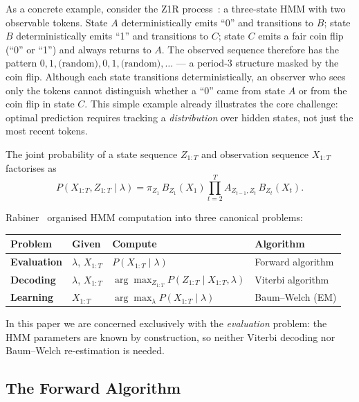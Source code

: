 \documentclass[11pt]{article}
\begin{document}
As a concrete example, consider the Z1R process~\cite{rabiner1989}: a three-state HMM with two observable tokens.  State $A$ deterministically emits ``0'' and transitions to $B$; state $B$ deterministically emits ``1'' and transitions to $C$; state $C$ emits a fair coin flip (``0'' or ``1'') and always returns to $A$.  The observed sequence therefore has the pattern $0, 1, \text{(random)}, 0, 1, \text{(random)}, \ldots$ --- a period-3 structure masked by the coin flip.  Although each state transitions deterministically, an observer who sees only the tokens cannot distinguish whether a ``0'' came from state $A$ or from the coin flip in state $C$.  This simple example already illustrates the core challenge: optimal prediction requires tracking a \emph{distribution} over hidden states, not just the most recent tokens.

The joint probability of a state sequence $Z_{1:T}$ and observation sequence $X_{1:T}$ factorises as
\begin{equation}\label{eq:joint}
  P(X_{1:T}, Z_{1:T} \mid \lambda)
  = \pi_{Z_1}\, B_{Z_1}(X_1) \prod_{t=2}^{T}
    A_{Z_{t-1},Z_t}\, B_{Z_t}(X_t).
\end{equation}

Rabiner~\cite{rabiner1989} organised HMM computation into three canonical problems:

\begin{center}
\begin{tabular}{llll}
  \toprule
  Problem & Given & Compute & Algorithm \\
  \midrule
  \textbf{Evaluation} & $\lambda$, $X_{1:T}$ & $P(X_{1:T} \mid \lambda)$
    & Forward algorithm \\
  \textbf{Decoding} & $\lambda$, $X_{1:T}$
    & $\arg\max_{Z_{1:T}} P(Z_{1:T} \mid X_{1:T}, \lambda)$
    & Viterbi algorithm \\
  \textbf{Learning} & $X_{1:T}$
    & $\arg\max_{\lambda} P(X_{1:T} \mid \lambda)$
    & Baum--Welch (EM) \\
  \bottomrule
\end{tabular}
\end{center}

\noindent In this paper we are concerned exclusively with the \emph{evaluation} problem: the HMM parameters are known by construction, so neither Viterbi decoding nor Baum--Welch re-estimation is needed.

\subsection{The Forward Algorithm}\label{sec:forward}
\end{document}
